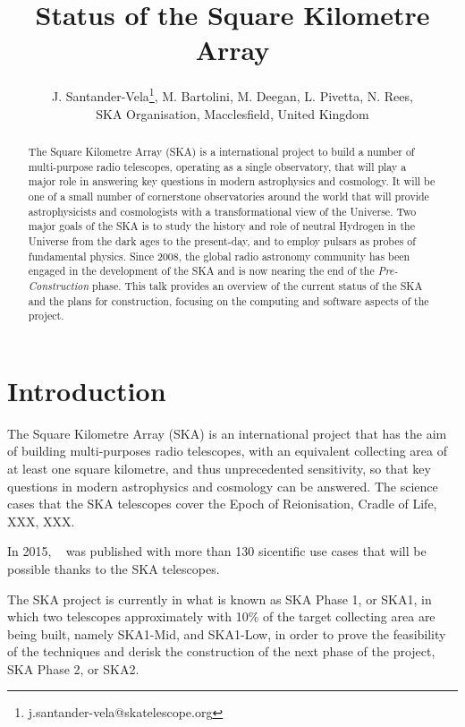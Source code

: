\documentclass[a4paper,
               biblatex,       %
               keeplastbox,    %
               ]{jacow-2_1}    %
\begin{document}
\title{Status of the Square Kilometre Array}

\author{
	J. Santander-Vela\thanks{j.santander-vela@skatelescope.org},
	M. Bartolini, M. Deegan, L. Pivetta, N. Rees,\\
	SKA Organisation, Macclesfield, United Kingdom
}
	
\maketitle

\begin{abstract}
	The Square Kilometre Array (SKA) is a international project to build a number of multi-purpose radio telescopes, operating as a single observatory, that will play a major role in answering key questions in modern astrophysics and cosmology. It will be one of a small number of cornerstone observatories around the world that will provide astrophysicists and cosmologists with a transformational view of the Universe. Two major goals of the SKA is to study the history and role of neutral Hydrogen in the Universe from the dark ages to the present-day, and to employ pulsars as probes of fundamental physics. Since 2008, the global radio astronomy community has been engaged in the development of the SKA and is now nearing the end of the \emph{Pre-Construction} phase. This talk provides an overview of the current status of the SKA and the plans for construction, focusing on the computing and software aspects of the project.
\end{abstract}


\section{Introduction} %
\label{sec:introduction}
The Square Kilometre Array (SKA) is an international project that has the aim of building multi-purposes radio telescopes, with an equivalent collecting area of at least one square kilometre, and thus unprecedented sensitivity, so that key questions in modern astrophysics and cosmology can be answered. The science cases that the SKA telescopes cover the Epoch of Reionisation, Cradle of Life, XXX, XXX. 

In 2015, ~\cite{2015aska.confE.....} was published with more than 130 sicentific use cases that will be possible thanks to the SKA telescopes.

The SKA project is currently in what is known as SKA Phase 1, or SKA1, in which two telescopes approximately with 10\% of the target collecting area are being built, namely SKA1-Mid, and SKA1-Low, in order to prove the feasibility of the techniques and derisk the construction of the next phase of the project, SKA Phase 2, or SKA2.
\end{document}
